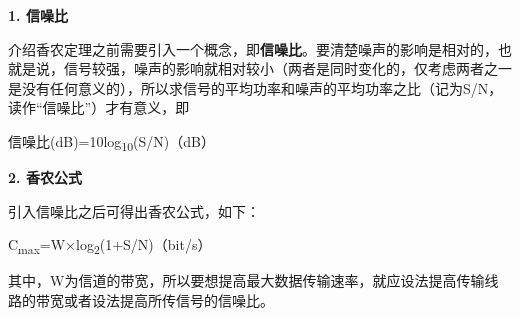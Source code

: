 \textbf{{1. 信}{噪比}}

介绍香农定理之前需要引入一个概念，即\textbf{{信}{噪比}}。{要清楚噪声的影响是相对的，也就是说，信号较强，噪声的影响就相对较小（两者是同时变化的，仅考虑两者之一是没有任何意义的），所以求信号的平均功率和噪声的平均功率之比（记为S/N，读作``信噪比''）才有意义，即}

\textbf{}

信噪比{(dB)=10log\textsubscript{10}(S/N)}（{dB}）

\textbf{{2. 香农公式}}

引入信噪比之后可得出香农公式，如下：{}

{C\textsubscript{max}=W×log\textsubscript{2}(1+S/N)}（{bit/s}）

\textbf{}

其中，W为信道的带宽，所以要想提高最大数据传输速率，就应设法提高传输线路的带宽或者设法提高所传信号的信噪比。
